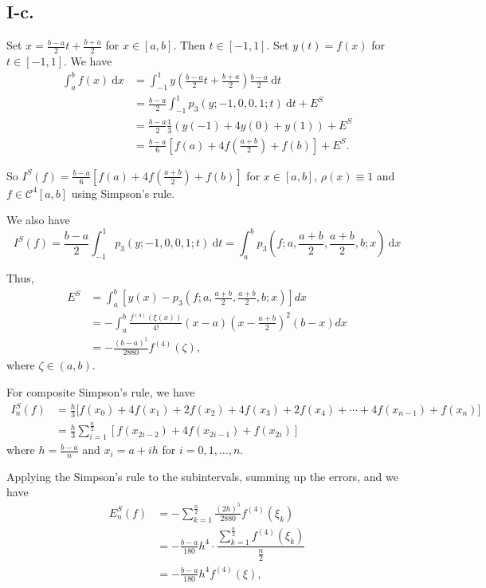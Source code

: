 \documentclass[a4paper]{article}
\begin{document}
\subsection*{I-c.}
Set $x=\frac{b-a}2t+\frac{b+a}2$ for $x\in[a,b]$. Then $t\in[-1,1]$. Set $y(t)=f(x)$ for $t\in[-1,1]$. We have
$$
\begin{aligned}
  \int_a^bf(x)\:\mathrm{d}x&=\int_{-1}^1y(\frac{b-a}2t+\frac{b+a}2)\frac{b-a}2\:\mathrm{d}t\\
  &=\frac{b-a}2\int_{-1}^1p_3(y;-1,0,0,1;t)\:\mathrm{d}t+E^S\\
  &=\frac{b-a}2\frac13(y(-1)+4y(0)+y(1))+E^S\\
  &=\frac{b-a}6[f(a)+4f(\frac{a+b}2)+f(b)]+E^S.
\end{aligned}
$$

So $I^S(f)=\frac{b-a}6[f(a)+4f(\frac{a+b}2)+f(b)]$ for $x\in[a,b]$, $\rho(x)\equiv1$ and $f\in\mathcal{C}^4[a,b]$ using Simpson's rule.

We also have 
$$
I^S(f)=\frac{b-a}2\int_{-1}^1p_3(y;-1,0,0,1;t)\:\mathrm{d}t=\int_a^bp_3(f;a,\frac{a+b}2,\frac{a+b}2,b;x)\:\mathrm{d}x
$$

Thus,
$$
\begin{aligned}
  E^{S}&=\int_a^b[y(x)-p_3(f;a,\frac{a+b}2,\frac{a+b}2,b;x)]dx\\
  &=-\int_a^b\frac{f^{(4)}(\xi(x))}{4!}(x-a)(x-\frac{a+b}2)^2(b-x)dx\\
  &=-\frac{(b-a)^5}{2880}f^{(4)}(\zeta),
\end{aligned}
$$
where $\zeta\in(a,b)$.

For composite Simpson's rule, we have
$$
\begin{aligned}
  I_{n}^{S}(f)&=\frac{h}{3}\big[f(x_{0})+4f(x_{1})+2f(x_{2})+4f(x_{3})+2f(x_{4})+\cdots+4f(x_{n-1})+f(x_{n})\big]\\
  &=\frac{h}{3}\sum_{i=1}^{\frac{n}{2}}[f(x_{2i-2})+4f(x_{2i-1})+f(x_{2i})]
\end{aligned}
$$
where $h=\frac{b-a}{n}$ and $x_{i}=a+ih$ for $i=0,1,\ldots,n$.

Applying the Simpson's rule to the subintervals, summing up the
errors, and we have
$$
\begin{aligned}
  E_n^S(f)&=-\sum_{k=1}^{\frac{n}{2}}\frac{(2h)^5}{2880}f^{(4)}(\xi_k)\\
  &=-\frac{b-a}{180}h^4\cdot\dfrac{\sum\limits_{k=1}^{\frac{n}{2}}f^{(4)}(\xi_k)}{\frac{n}{2}}\\
  &=-\frac{b-a}{180}h^4f^{(4)}(\xi),
\end{aligned}
$$
\end{document}

